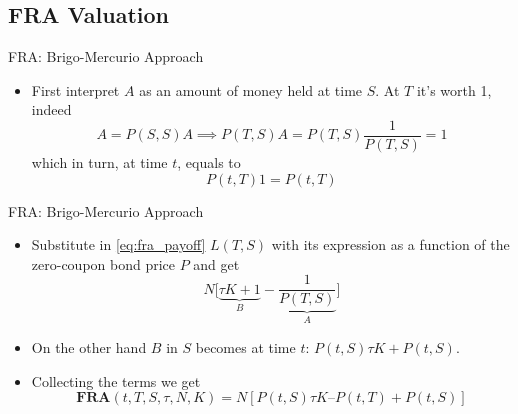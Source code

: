 \documentclass{beamer}
\begin{document}
%	
%	

\subsection{FRA Valuation}
\begin{frame}{FRA: Brigo-Mercurio Approach}
	\begin{itemize}
		\item<2-> First interpret $A$ as an amount of money held at time $S$. At $T$ it's worth 1, indeed 
		\begin{equation*}
			A = P(S,S)A \implies P(T,S)A = P(T,S)\frac{1}{P(T,S)}=1
		\end{equation*}
		which in turn, at time $t$, equals to
		\begin{equation*}
			P(t,T) 1 = P(t,T)
		\end{equation*}
	\end{itemize}
\end{frame}

\begin{frame}{FRA: Brigo-Mercurio Approach}
	\begin{itemize}
		\item Substitute in \cref{eq:fra_payoff} $L(T,S)$ with its expression as a function of the zero-coupon bond price $P$ and get
		\begin{equation*}
			N\bigg[\underbrace{\tau K + 1}_{B} - \underbrace{\frac{1}{P(T, S)}}_{A}\bigg]
		\end{equation*}
		\item<1-> On the other hand $B$ in $S$ becomes at time $t$:
		$P(t,S)\tau K + P(t, S)$.
		\item<2-> Collecting the terms we get
		\begin{equation}
			\textbf{FRA}(t,T,S,\tau,N,K)=N[P(t,S)\tau K–P(t,T)+P(t,S)]
		\end{equation}
			\myendproof
	\end{itemize}
\end{frame}
\end{document}
